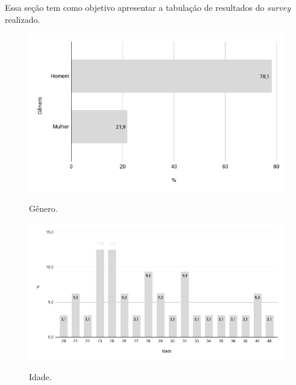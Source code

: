 \label{sec:resultadospesquisa}


Essa seção tem como objetivo apresentar a tabulação de resultados do \textit{survey} realizado.



        \begin{figure}[!htb]
        \centering
        \includegraphics[width=.80\textwidth]{images/s_genero.png}
        \label{figure:s_genero}
        \caption{Gênero.}
        \end{figure}
    
    
        \begin{figure}[!htb]
        \centering
        \includegraphics[width=.80\textwidth]{images/s_idade.png}
        \label{figure:s_idade}
        \caption{Idade.}
        \end{figure}
    
